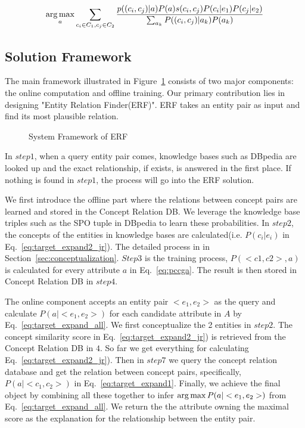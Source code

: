 \begin{equation}
\label{eq:target_expand_all}
\begin{split}
 \operatorname*{arg\,max}_a \sum_{c_i\in C_1, c_j\in C_2}\frac{ p((c_{i},c_{j})|a) P(a) s(c_i,c_j) P(c_i|e_1) P(c_j|e_2) }{ \sum_{a_k}{P( (c_{i},c_{j})|a_k) P(a_k)   } }
\end{split}
\end{equation}



\subsection{Solution Framework}
The main framework illustrated in Figure~\ref{fig:framework} consists of two major components: the online computation and offline training.
Our primary contribution lies in designing \ac{"Entity Relation Finder(ERF)"}.
ERF takes an entity pair as input and find its most plausible relation.

\begin{figure}[!hptb]

\centering
{}
\caption{System Framework of ERF}
\label{fig:framework}
\end{figure}

In  $step 1$, when a query entity pair comes, knowledge bases such as DBpedia are looked up and the exact relationship, if exists, is answered in the first place.
If nothing is found in $step 1$, the process will go into the ERF solution.

We first introduce the offline part where the relations between concept pairs are learned and stored in the Concept Relation DB.
We leverage the knowledge base triples such as the SPO tuple in DBpedia  to learn these probabilities.
In $step 2$, the concepts of the entities in knowledge bases are calculated(i.e. $P(c_i|e_i)$ in Eq.~\ref{eq:target_expand2_jr}).
The detailed process in in Section~\ref{sec:conceptualization}.
$Step 3$ is the training process, $P(<c1,c2>,a)$ is calculated for every attribute $a$ in Eq.~\ref{eq:pccga}.
The result is then stored in Concept Relation DB in $step 4$.

The online component accepts an entity pair $<e_1, e_2>$ as the query and calculate $ P(a| <e_1,e_2> )$ for each candidate attribute in $A$ by Eq.~\ref{eq:target_expand_all}.
We first conceptualize the 2 entities in $step 2$.
The concept similarity score in Eq.~\ref{eq:target_expand2_jr}) is retrieved from the Concept Relation DB in $4$.
So far we get everything for calculating Eq.~\ref{eq:target_expand2_jr}).
Then in $step 7$ we query the concept relation database and get the relation between concept pairs, specifically, $P(a|<c_1,c_2>)$ in Eq.~\ref{eq:target_expand1}.
Finally, we achieve the final object by combining all these together to infer $\operatorname*{arg\,max} P(a|<e_1,e_2>)$ from Eq.~\ref{eq:target_expand_all}.
We return the the attribute owning the maximal score as the explanation for the relationship between the entity pair.

